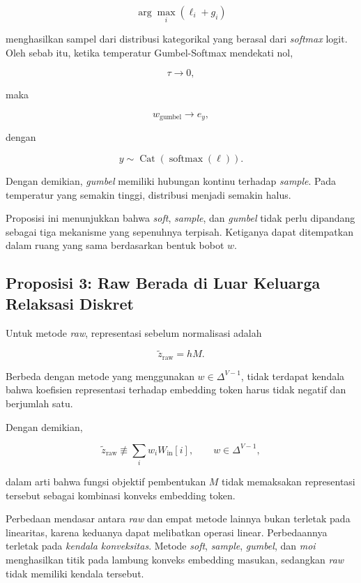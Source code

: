 \[
\arg\max_i(\ell_i+g_i)
\]

menghasilkan sampel dari distribusi kategorikal yang berasal dari \textit{softmax} logit. Oleh sebab itu, ketika temperatur Gumbel-Softmax mendekati nol,

\[
\tau\rightarrow0,
\]

maka

\[
w_{\mathrm{gumbel}}
\rightarrow e_y,
\]

dengan

\begin{equation}
y\sim\operatorname{Cat}(\operatorname{softmax}(\ell)).
\end{equation}

Dengan demikian, \textit{gumbel} memiliki hubungan kontinu terhadap \textit{sample}. Pada temperatur yang semakin tinggi, distribusi menjadi semakin halus.

Proposisi ini menunjukkan bahwa \textit{soft}, \textit{sample}, dan \textit{gumbel} tidak perlu dipandang sebagai tiga mekanisme yang sepenuhnya terpisah. Ketiganya dapat ditempatkan dalam ruang yang sama berdasarkan bentuk bobot \(w\).

\subsection{Proposisi 3: Raw Berada di Luar Keluarga Relaksasi Diskret}

Untuk metode \textit{raw}, representasi sebelum normalisasi adalah

\begin{equation}
\tilde z_{\mathrm{raw}}=hM.
\end{equation}

Berbeda dengan metode yang menggunakan \(w\in\Delta^{V-1}\), tidak terdapat kendala bahwa koefisien representasi terhadap embedding token harus tidak negatif dan berjumlah satu.

Dengan demikian,

\[
\tilde z_{\mathrm{raw}}
\not\equiv
\sum_iw_iW_{\mathrm{in}}[i],
\qquad
w\in\Delta^{V-1},
\]

dalam arti bahwa fungsi objektif pembentukan \(M\) tidak memaksakan representasi tersebut sebagai kombinasi konveks embedding token.

Perbedaan mendasar antara \textit{raw} dan empat metode lainnya bukan terletak pada linearitas, karena keduanya dapat melibatkan operasi linear. Perbedaannya terletak pada \textit{kendala konveksitas}. Metode \textit{soft}, \textit{sample}, \textit{gumbel}, dan \textit{moi} menghasilkan titik pada lambung konveks embedding masukan, sedangkan \textit{raw} tidak memiliki kendala tersebut.

